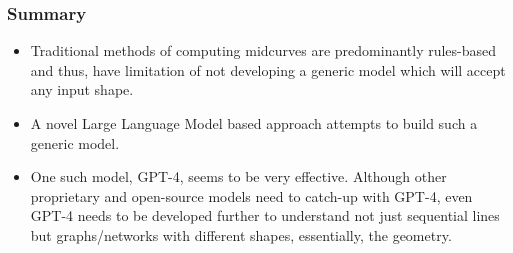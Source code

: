 \begin{frame}[fragile]\frametitle{Summary}
	\begin{itemize}
	\item Traditional methods of computing midcurves are predominantly rules-based and thus, have limitation of not developing a generic model which will accept any input shape. 	
	\item A novel Large Language Model based approach attempts to build such a generic model. 
	\item One such model, GPT-4, seems to be very effective. Although other proprietary and open-source models need to catch-up with GPT-4, even GPT-4 needs to be developed further to understand not just sequential lines but graphs/networks with different shapes, essentially, the geometry.  
	\end{itemize}	
\end{frame}
